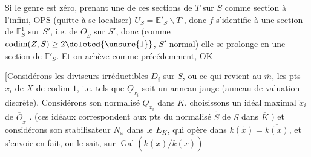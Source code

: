 Si le genre est zéro, prenant une de ces sections de $T$ sur $S$ comme section à l'infini, OPS (quitte à se localiser) $U_S=\mathbb E'_S\smallsetminus T'$, donc $f$ s'identifie à une section de $\mathbb E^1_S$ sur $S'$, i.e. de $\underline O_S$ sur $S'$, donc (comme $\operatorname{codim}(Z,S)\geq2\deleted{\unsure{1}}$, $S'$ normal) elle se prolonge en une section de $\mathbb E'_S$. Et on achève comme précédemment, OK

[Considérons  les diviseurs irréductibles $D_i$ sur $S$, ou ce qui revient au $\overline m$, les pts $x_i$ de $X$ de codim $1$, i.e. tels que $\underline O_{x_i}$ soit un anneau-jauge (anneau de valuation discrète). Considérons son normalisé $\overline{\underline O}_{x_i}$ dans $\overline K$, choisissons un idéal maximal $\widetilde x_i$ de $\overline{\underline O}_x$ . (ces idéaux correspondent aux pts du normalisé $\widetilde S$ de $S$ dans $\overline K$ ) et considérons son stabilisateur $N_x$ dans le $E_K$, qui opère  dans $k(\widetilde x)=\overline{k(x)}$, et s'envoie en fait, on le sait, \uline{sur} $\operatorname{Gal}(\overline{k(x)}/k(x))$
